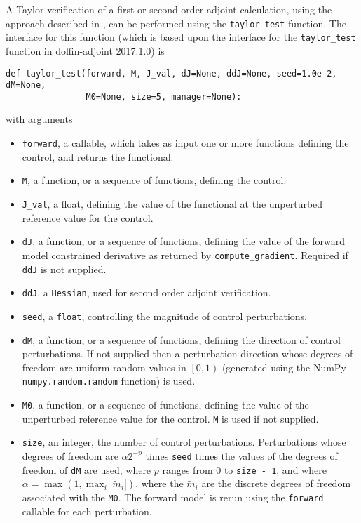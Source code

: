 \documentclass[11pt]{article}
\begin{document}
A Taylor verification of a first or second order adjoint calculation, using the
approach described in \citet{farrell2013}, can be performed using the
\texttt{taylor\_test} function. The interface for this function (which is based
upon the interface for the \texttt{taylor\_test} function in dolfin-adjoint
2017.1.0) is
\begin{lstlisting}
def taylor_test(forward, M, J_val, dJ=None, ddJ=None, seed=1.0e-2, dM=None,
                M0=None, size=5, manager=None):
\end{lstlisting}
with arguments
\begin{itemize}
  \item \texttt{forward}, a callable, which takes as input one or more
    functions defining the control, and returns the functional.
  \item \texttt{M}, a function, or a sequence of functions, defining the
    control.
  \item \texttt{J\_val}, a float, defining the value of the functional at the
    unperturbed reference value for the control.
  \item \texttt{dJ}, a function, or a sequence of functions, defining the value
    of the forward model constrained derivative as returned by
    \texttt{compute\_gradient}. Required if \texttt{ddJ} is not supplied.
  \item \texttt{ddJ}, a \texttt{Hessian}, used for second order adjoint
    verification.
  \item \texttt{seed}, a \texttt{float}, controlling the magnitude of control
    perturbations.
  \item \texttt{dM}, a function, or a sequence of functions, defining the
    direction of control perturbations. If not supplied then a perturbation
    direction whose degrees of freedom are uniform random values in $\left[ 0,
    1 \right)$ (generated using the NumPy \texttt{numpy.random.random}
    function) is used.
  \item \texttt{M0}, a function, or a sequence of functions, defining the value
    of the unperturbed reference value for the control. \texttt{M} is used if
    not supplied.
  \item \texttt{size}, an integer, the number of control perturbations.
    Perturbations whose degrees of freedom are $\alpha 2^{-p}$ times
    \texttt{seed} times the values of the degrees of freedom of \texttt{dM} are
    used, where $p$ ranges from $0$ to \texttt{size - 1}, and where $\alpha =
    \max \left( 1, \max_i \left| \tilde{m}_i \right| \right)$, where the
    $\tilde{m}_i$ are the discrete degrees of freedom associated with the
    \texttt{M0}. The forward model is rerun using the \texttt{forward} callable
    for each perturbation.
\end{itemize}
\end{document}
